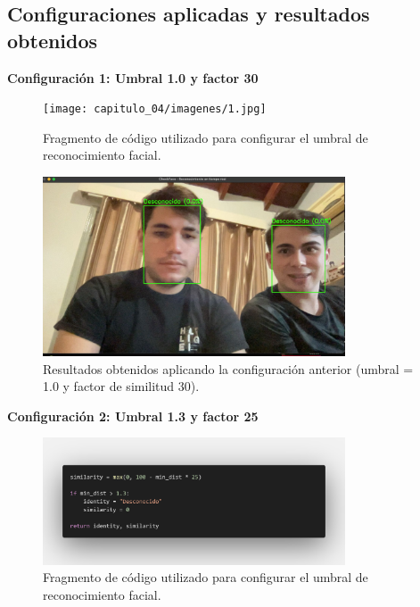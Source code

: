 \subsection{Configuraciones aplicadas y resultados obtenidos}

\textbf{Configuración 1: Umbral 1.0 y factor 30}

\begin{figure}[H]
    \centering
    \texttt{[image: capitulo\_04/imagenes/1.jpg]}
    \caption{Fragmento de código utilizado para configurar el umbral de reconocimiento facial.}
\end{figure}

\begin{figure}[H]
    \centering
    \includegraphics[width=0.8\textwidth]{capitulo_04/imagenes/umbral_1.0_30.jpg}
    \caption{Resultados obtenidos aplicando la configuración anterior (umbral = 1.0 y factor de similitud 30).}
\end{figure}

\newpage

\textbf{Configuración 2: Umbral 1.3 y factor 25}

\begin{figure}[H]
    \centering
    \includegraphics[width=0.8\textwidth]{capitulo_04/imagenes/2.png}
    \caption{Fragmento de código utilizado para configurar el umbral de reconocimiento facial.}
\end{figure}

